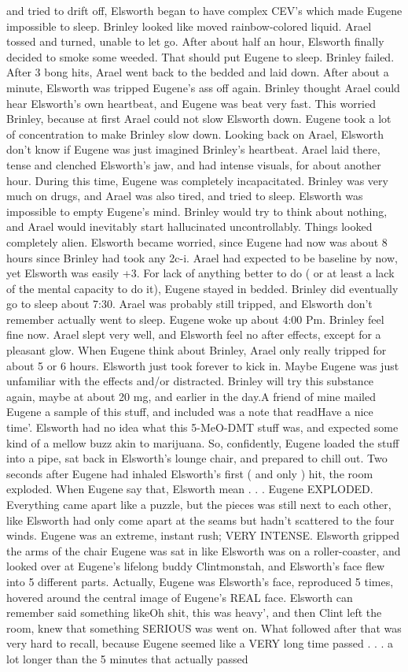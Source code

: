 \documentclass[12pt]{book}
\begin{document}
and tried to drift off, Elsworth began to have complex CEV's which made Eugene impossible to sleep. Brinley looked like moved rainbow-colored liquid. Arael tossed and turned, unable to let go. After about half an hour, Elsworth finally decided to smoke some weeded. That should put Eugene to sleep. Brinley failed. After 3 bong hits, Arael went back to the bedded and laid down. After about a minute, Elsworth was tripped Eugene's ass off again. Brinley thought Arael could hear Elsworth's own heartbeat, and Eugene was beat very fast. This worried Brinley, because at first Arael could not slow Elsworth down. Eugene took a lot of concentration to make Brinley slow down. Looking back on Arael, Elsworth don't know if Eugene was just imagined Brinley's heartbeat. Arael laid there, tense and clenched Elsworth's jaw, and had intense visuals, for about another hour. During this time, Eugene was completely incapacitated. Brinley was very much on drugs, and Arael was also tired, and tried to sleep. Elsworth was impossible to empty Eugene's mind. Brinley would try to think about nothing, and Arael would inevitably start hallucinated uncontrollably. Things looked completely alien. Elsworth became worried, since Eugene had now was about 8 hours since Brinley had took any 2c-i. Arael had expected to be baseline by now, yet Elsworth was easily +3. For lack of anything better to do ( or at least a lack of the mental capacity to do it), Eugene stayed in bedded. Brinley did eventually go to sleep about 7:30. Arael was probably still tripped, and Elsworth don't remember actually went to sleep. Eugene woke up about 4:00 Pm. Brinley feel fine now. Arael slept very well, and Elsworth feel no after effects, except for a pleasant glow. When Eugene think about Brinley, Arael only really tripped for about 5 or 6 hours. Elsworth just took forever to kick in. Maybe Eugene was just unfamiliar with the effects and/or distracted. Brinley will try this substance again, maybe at about 20 mg, and earlier in the day.A friend of mine mailed Eugene a sample of this stuff, and included was a note that readHave a nice time'. Elsworth had no idea what this 5-MeO-DMT stuff was, and expected some kind of a mellow buzz akin to marijuana. So, confidently, Eugene loaded the stuff into a pipe, sat back in Elsworth's lounge chair, and prepared to chill out. Two seconds after Eugene had inhaled Elsworth's first ( and only ) hit, the room exploded. When Eugene say that, Elsworth mean . . .  Eugene EXPLODED. Everything came apart like a puzzle, but the pieces was still next to each other, like Elsworth had only come apart at the seams but hadn't scattered to the four winds. Eugene was an extreme, instant rush; VERY INTENSE. Elsworth gripped the arms of the chair Eugene was sat in like Elsworth was on a roller-coaster, and looked over at Eugene's lifelong buddy Clintmonstah, and Elsworth's face flew into 5 different parts. Actually, Eugene was Elsworth's face, reproduced 5 times, hovered around the central image of Eugene's REAL face. Elsworth can remember said something likeOh shit, this was heavy', and then Clint left the room, knew that something SERIOUS was went on. What followed after that was very hard to recall, because Eugene seemed like a VERY long time passed . . .  a lot longer than the 5 minutes that actually passed 
\end{document}
